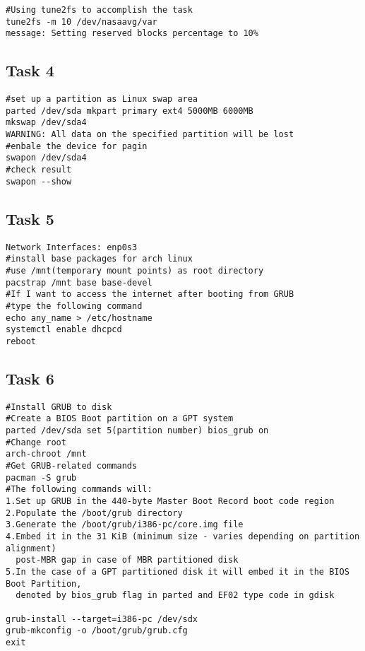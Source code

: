 \documentclass{article}
\begin{document}
\begin{verbatim}
#Using tune2fs to accomplish the task
tune2fs -m 10 /dev/nasaavg/var
message: Setting reserved blocks percentage to 10%
\end{verbatim}

        \subsection{Task 4}

\begin{verbatim}
#set up a partition as Linux swap area
parted /dev/sda mkpart primary ext4 5000MB 6000MB
mkswap /dev/sda4
WARNING: All data on the specified partition will be lost
#enbale the device for pagin
swapon /dev/sda4
#check result
swapon --show
\end{verbatim}

        \subsection{Task 5}

\begin{verbatim}
Network Interfaces: enp0s3
#install base packages for arch linux
#use /mnt(temporary mount points) as root directory
pacstrap /mnt base base-devel
#If I want to access the internet after booting from GRUB
#type the following command
echo any_name > /etc/hostname
systemctl enable dhcpcd
reboot
\end{verbatim}

        \subsection{Task 6}

\begin{verbatim}
#Install GRUB to disk
#Create a BIOS Boot partition on a GPT system
parted /dev/sda set 5(partition number) bios_grub on
#Change root
arch-chroot /mnt
#Get GRUB-related commands
pacman -S grub
#The following commands will:
1.Set up GRUB in the 440-byte Master Boot Record boot code region
2.Populate the /boot/grub directory
3.Generate the /boot/grub/i386-pc/core.img file
4.Embed it in the 31 KiB (minimum size - varies depending on partition alignment)
  post-MBR gap in case of MBR partitioned disk
5.In the case of a GPT partitioned disk it will embed it in the BIOS Boot Partition,
  denoted by bios_grub flag in parted and EF02 type code in gdisk

grub-install --target=i386-pc /dev/sdx
grub-mkconfig -o /boot/grub/grub.cfg
exit
\end{verbatim}
\end{document}
